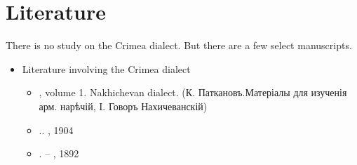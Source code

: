 \begin{table}[H]
	\centering
	\caption{Participles or converbs <> of the verb `to like' in the Crimea dialect}
	\label{tab:Crimea:morpho:verb:paradigm:participle}
\end{table}

\begin{adjarianpage}\label{page:266}\end{adjarianpage}%


\section{Literature}

There is no study on the Crimea dialect. But there are a few select manuscripts. 


{\litoverview}

\begin{itemize}
	\item Literature involving the Crimea dialect
	\begin{itemize}
		\item \citet{Patkanian-1875-RussianDialects}, volume 1. Nakhichevan dialect. (К. Паткановъ.\newline Матеріалы для изученія арм. нарѣчій, I. Говоръ Нахичеванскій)
		\item {}.. , 1904
		\item {}. – , 1892
	\end{itemize}
\end{itemize}


